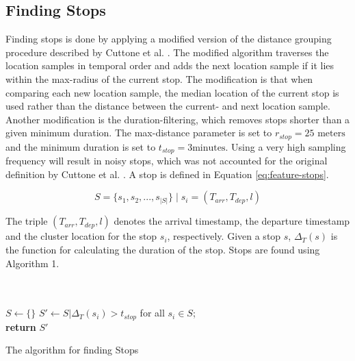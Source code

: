 \subsection{Finding Stops}
Finding stops is done by applying a modified version of the distance grouping procedure described by Cuttone et al. \cite{sparse-location-2014}. The modified algorithm traverses the location samples in temporal order and adds the next location sample if it lies within the max-radius of the current stop. The modification is that when comparing each new location sample, the median location of the current stop is used rather than the distance between the current- and next location sample. Another modification is the duration-filtering, which removes stops shorter than a given minimum duration. The max-distance parameter is set to $r_{stop} = 25 \text{ meters}$ and the minimum duration is set to $t_{stop} = 3 \text{minutes}$. Using a very high sampling frequency will result in noisy stops, which was not accounted for the original definition by Cuttone et al. \cite{sparse-location-2014}. A stop is defined in Equation \eqref{eq:feature-stops}.

\begin{equation}
\label{eq:feature-stops}
S = \{s_1, s_2, ..., s_{|S|}\} \;| \; s_i = (T_{arr}, T_{dep}, l)
\end{equation}

The triple $(T_{arr}, T_{dep}, l)$ denotes the arrival timestamp, the departure timestamp and the cluster location for the stop $s_i$, respectively. Given a stop $s$, $\Delta_ T(s)$ is the function for calculating the duration of the stop. Stops are found using Algorithm 1.

\begin{algorithm}[H]
\SetAlgoLined
{}\\
\\

 $S \leftarrow \{ \}$\;
 $S' \leftarrow S | \Delta_ T(s_i) > t_{stop}$ for all $s_i \in S$;\\
 \textbf{return} $S'$\;
 \label{algo:stops}
 \caption{The algorithm for finding Stops}
\end{algorithm}

